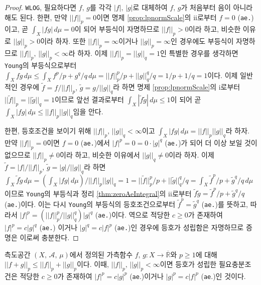 \begin{proof}
    \texttt{WLOG}, 필요하다면 $f,\,g$를 각각 $|f|,\,|g|$로 대체하여 $f,\,g$가 처음부터 음이 아니라 해도 된다. 한편, 만약 $||f||_p=0$이면 명제 \ref{prop:lpnormScale}의 ii로부터 $f=0$ (\texttt{ae.})이고, 곧 $\int_X|fg|\,d\mu=0$이 되어 부등식이 자명하므로 $||f||_p>0$이라 하고, 비슷한 이유로 $||g||_p>0$이라 하자. 또한 $||f||_p=\infty$이거나 $||g||_p=\infty$인 경우에도 부등식이 자명하므로 $||f||_p,\,||g||_p<\infty$라 하자. 이제 $||f||_p=||g||_q=1$인 특별한 경우를 생각하면 \texttt{Young}의 부등식으로부터 $\int_Xfg\,d\mu\leq\int_Xf^p/p+g^q/q\,d\mu=||f||_p^p/p+||g||_q^q/q=1/p+1/q=1$이다. 이제 일반적인 경우에 $\widetilde{f}=f/||f||_p,\,\widetilde{g}=g/||g||_q$라 하면 명제 \ref{prop:lpnormScale}의 i로부터 $||\widetilde{f}||_p=||\widetilde{g}||_q=1$이므로 앞선 결과로부터 $\int_X|\widetilde{f}\widetilde{g}|\,d\mu\leq1$이 되어 곧 $\int_X|fg|\,d\mu\leq||f||_p||g||_q$임을 안다.

    한편, 등호조건을 보이기 위해 $||f||_p,\,||g||_q<\infty$이고 $\int_X|fg|\,d\mu=||f||_p||g||_q$라 하자. 만약 $||f||_p=0$이면 $f=0$ (\texttt{ae.})에서 $|f|^p=0=0\cdot|g|^q$ (\texttt{ae.})가 되어 더 이상 보일 것이 없으므로 $||f||_p\ne0$이라 하고, 비슷한 이유에서 $||g||_q\ne0$이라 하자. 이제 $\widetilde{f}=|f|/||f||_p,\,\widetilde{g}=|g|/||g||_q$라 하면 $\int_X\widetilde{f}\widetilde{g}\,d\mu=(\int_X|fg|\,d\mu)/||f||_p||g||_q=1=||\widetilde{f}||_p^p/p+||\widetilde{g}||_q^q/q=\int_X\widetilde{f}^p/p+\widetilde{g}^q/q\,d\mu$이므로 \texttt{Young}의 부등식과 정리 \ref{thm:zeroAeIntegral}의 ii로부터 $\widetilde{f}\widetilde{g}=\widetilde{f}^p/p+\widetilde{g}^q/q$ (\texttt{ae.})이다. 이는 다시 \texttt{Young}의 부등식의 등호조건으로부터 $\widetilde{f}^p=\widetilde{g}^q$ (\texttt{ae.})를 뜻하고, 따라서 $|f|^p=(||f||_p^p/||g||_q^q)|g|^q$ (\texttt{ae.})이다. 역으로 적당한 $c\geq0$가 존재하여 $|f|^p=c|g|^q$ (\texttt{ae.}) 이거나 $|g|^q=c|f|^p$ (\texttt{ae.})인 경우에 등호가 성립함은 자명하므로 증명은 이로써 충분한다.
\end{proof}

\begin{theorem}
    측도공간 $(X,\,\mathcal{A},\,\mu)$에서 정의된 가측함수 $f,\,g:X\to\overline{\mathbb{R}}$와 $p\geq1$에 대해 $||f+g||_p\leq||f||_p+||g||_p$이다. 이때, $||f||_p,\,||g||_p<\infty$이면 등호가 성립한 필요충분조건은 적당한 $c\geq0$가 존재하여 $|f|^p=c|g|^p$ (\texttt{ae}.)이거나 $|g|^p=c|f|^p$ (\texttt{ae}.)인 것이다.
\end{theorem}

